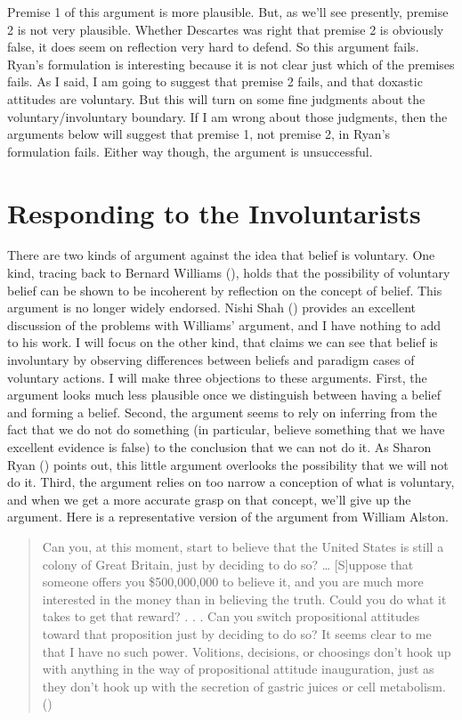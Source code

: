 \documentclass[
  11pt,
  letterpaper,
  DIV=11,
  numbers=noendperiod,
  oneside]{scrartcl}
\begin{document}
Premise 1 of this argument is more plausible. But, as we'll see
presently, premise 2 is not very plausible. Whether Descartes was right
that premise 2 is obviously false, it does seem on reflection very hard
to defend. So this argument fails. Ryan's formulation is interesting
because it is not clear just which of the premises fails. As I said, I
am going to suggest that premise 2 fails, and that doxastic attitudes
are voluntary. But this will turn on some fine judgments about the
voluntary/involuntary boundary. If I am wrong about those judgments,
then the arguments below will suggest that premise 1, not premise 2, in
Ryan's formulation fails. Either way though, the argument is
unsuccessful.

\section{Responding to the
Involuntarists}\label{responding-to-the-involuntarists}

There are two kinds of argument against the idea that belief is
voluntary. One kind, tracing back to Bernard Williams
(), holds that the
possibility of voluntary belief can be shown to be incoherent by
reflection on the concept of belief. This argument is no longer widely
endorsed. Nishi Shah () provides an
excellent discussion of the problems with Williams' argument, and I have
nothing to add to his work. I will focus on the other kind, that claims
we can see that belief is involuntary by observing differences between
beliefs and paradigm cases of voluntary actions. I will make three
objections to these arguments. First, the argument looks much less
plausible once we distinguish between having a belief and forming a
belief. Second, the argument seems to rely on inferring from the fact
that we do not do something (in particular, believe something that we
have excellent evidence is false) to the conclusion that we can not do
it. As Sharon Ryan () points out, this
little argument overlooks the possibility that we will not do it. Third,
the argument relies on too narrow a conception of what is voluntary, and
when we get a more accurate grasp on that concept, we'll give up the
argument. Here is a representative version of the argument from William
Alston.

\begin{quote}
Can you, at this moment, start to believe that the United States is
still a colony of Great Britain, just by deciding to do so? \ldots{}
{[}S{]}uppose that someone offers you \$500,000,000 to believe it, and
you are much more interested in the money than in believing the truth.
Could you do what it takes to get that reward? . . . Can you switch
propositional attitudes toward that proposition just by deciding to do
so? It seems clear to me that I have no such power. Volitions,
decisions, or choosings don't hook up with anything in the way of
propositional attitude inauguration, just as they don't hook up with the
secretion of gastric juices or cell metabolism.
()
\end{quote}
\end{document}
